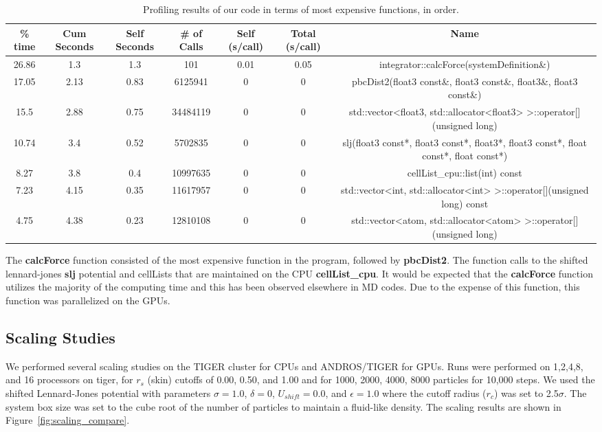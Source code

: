 \documentclass[12pt]{article}
\begin{document}
\begin{table}[htbp]
  \centering
  \tiny
  \caption{Profiling results of our code in terms of most expensive functions, in order.}
    \begin{tabular}{ccccccc}
    \toprule
    \% time & Cum Seconds & Self Seconds & \# of Calls & Self (s/call) & Total (s/call) & Name \\
    \midrule
    26.86 & 1.3   & 1.3   & 101   & 0.01  & 0.05  & integrator::calcForce(systemDefinition\&) \\
    17.05 & 2.13  & 0.83  & 6125941 & 0     & 0     & pbcDist2(float3 const\&, float3 const\&, float3\&, float3 const\&) \\
    15.5  & 2.88  & 0.75  & 34484119 & 0     & 0     & std::vector<float3, std::allocator<float3> >::operator[](unsigned long) \\
    10.74 & 3.4   & 0.52  & 5702835 & 0     & 0     & slj(float3 const*, float3 const*, float3*, float3 const*, float const*, float const*) \\
    8.27  & 3.8   & 0.4   & 10997635 & 0     & 0     & cellList\_cpu::list(int) const \\
    7.23  & 4.15  & 0.35  & 11617957 & 0     & 0     & std::vector<int, std::allocator<int> >::operator[](unsigned long) const \\
    4.75  & 4.38  & 0.23  & 12810108 & 0     & 0     & std::vector<atom, std::allocator<atom> >::operator[](unsigned long) \\
    \bottomrule
    \end{tabular}%
  \label{tab:profiling}%
\end{table}%

The \textbf{calcForce} function consisted of the most expensive function in the program, followed by \textbf{pbcDist2}. The function calls to the shifted lennard-jones \textbf{slj} potential and cellLists that are maintained on the CPU \textbf{cellList\_cpu}. It would be expected that the \textbf{calcForce} function utilizes the majority of the computing time and this has been observed elsewhere in MD codes. Due to the expense of this function, this function was parallelized on the GPUs.

\subsection{Scaling Studies}
\label{sec:scalingstudies}

We performed several scaling studies on the TIGER cluster for CPUs and ANDROS/TIGER for GPUs. Runs were performed on 1,2,4,8, and 16 processors on tiger, for $r_{s}$ (skin) cutoffs of 0.00, 0.50, and 1.00 and for 1000, 2000, 4000, 8000 particles for 10,000 steps. We used the shifted Lennard-Jones potential with parameters $\sigma = 1.0$, $\delta = 0$, $U_{shift} = 0.0$, and $\epsilon = 1.0$ where the cutoff radius ($r_c$) was set to 2.5$\sigma$.  The system box size was set to the cube root of the number of particles to maintain a fluid-like density.  The scaling results are shown in Figure~\ref{fig:scaling_compare}.  
\end{document}
